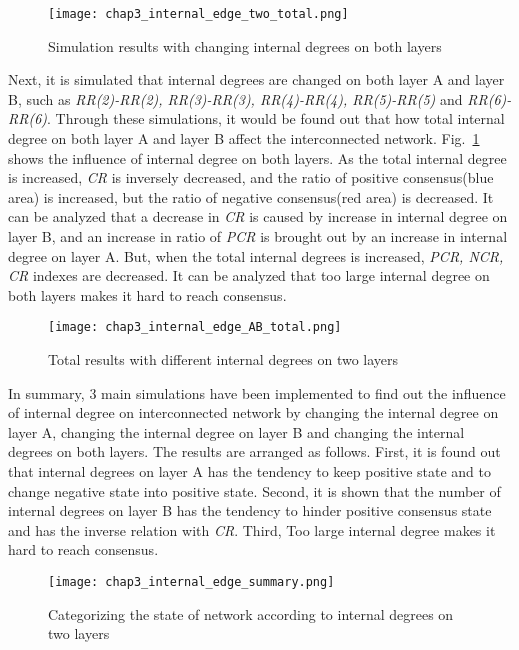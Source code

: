 \begin{figure}[!htb]
	\centering
	\texttt{[image: chap3\_internal\_edge\_two\_total.png]}
	\caption{Simulation results with changing internal degrees on both layers}
	\label{chap3_internal_edge_two_total}
\end{figure}
Next, it is simulated that internal degrees are changed on both layer A and layer B, such as \textit{RR(2)-RR(2), RR(3)-RR(3), RR(4)-RR(4), RR(5)-RR(5)} and \textit{RR(6)-RR(6)}. Through these simulations, it would be found out that how total internal degree on both layer A and layer B affect the interconnected network.
Fig.~\ref{chap3_internal_edge_two_total} shows the influence of internal degree on both layers. As the total internal degree is increased, \textit{CR} is inversely decreased, and the ratio of positive consensus(blue area) is increased, but the ratio of negative consensus(red area) is decreased. It can be analyzed that a decrease in \textit{CR} is caused by increase in internal degree on layer B, and an increase in ratio of \textit{PCR} is brought out by an increase in internal degree on layer A. But, when the total internal degrees is increased, \textit{PCR, NCR, CR} indexes are decreased. It can be analyzed that too large internal degree on both layers makes it hard to reach consensus. 
\begin{figure}[!htb]
	\centering
	\texttt{[image: chap3\_internal\_edge\_AB\_total.png]}
	\caption{Total results with different internal degrees on two layers}
	\label{chap3_internal_edge_AB_total}
\end{figure}
In summary, 3 main simulations have been implemented to find out the influence of internal degree on interconnected network by changing the internal degree on layer A, changing the internal degree on layer B and changing the internal degrees on both layers. The results are arranged as follows. First, it is found out that internal degrees on layer A has the tendency to keep positive state and to change negative state into positive state. Second,  it is shown that the number of internal degrees on layer B has the tendency to hinder positive consensus state and has the inverse relation with \textit{CR}. Third, Too large internal degree makes it hard to reach consensus. \\
\begin{figure}[!htb]
	\centering
	\texttt{[image: chap3\_internal\_edge\_summary.png]}
	\caption{Categorizing the state of network according to internal degrees on two layers}
	\label{chap3_internal_edge_summary}
\end{figure}
